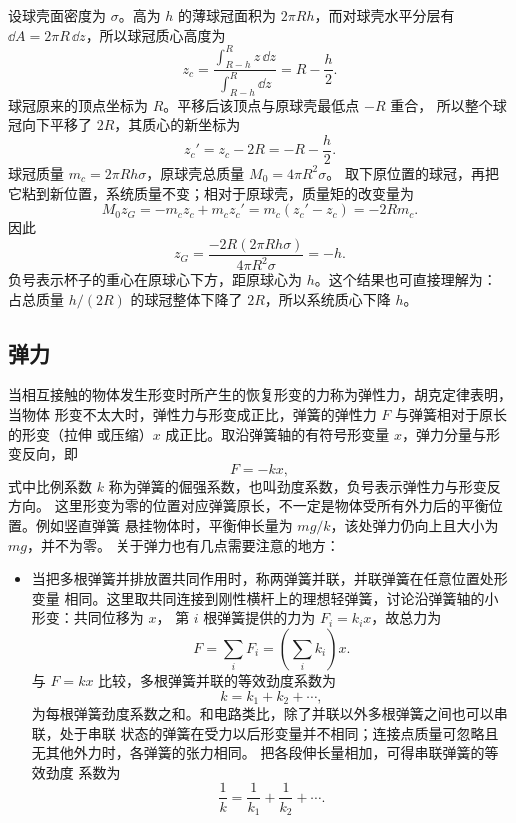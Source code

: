 {\begin{xesolution}
设球壳面密度为 $\sigma$。高为 $h$ 的薄球冠面积为 $2\pi Rh$，而对球壳水平分层有
$\dd A=2\pi R\,\dd z$，所以球冠质心高度为
\[
  z_c=\frac{\int_{R-h}^{R}z\,\dd z}{\int_{R-h}^{R}\dd z}
  =R-\frac h2.
\]
球冠原来的顶点坐标为 $R$。平移后该顶点与原球壳最低点 $-R$ 重合，
所以整个球冠向下平移了 $2R$，其质心的新坐标为
\[
  z_c'=z_c-2R=-R-\frac h2.
\]
球冠质量 $m_c=2\pi Rh\sigma$，原球壳总质量 $M_0=4\pi R^2\sigma$。
取下原位置的球冠，再把它粘到新位置，系统质量不变；相对于原球壳，质量矩的改变量为
\[
  M_0z_G=-m_cz_c+m_cz_c'
  =m_c(z_c'-z_c)=-2Rm_c.
\]
因此
\[
  z_G=\frac{-2R(2\pi Rh\sigma)}{4\pi R^2\sigma}
  =\boxed{-h}.
\]
负号表示杯子的重心在原球心下方，距原球心为 $h$。这个结果也可直接理解为：
占总质量 $h/(2R)$ 的球冠整体下降了 $2R$，所以系统质心下降 $h$。
\end{xesolution}

\subsection{弹力}

当相互接触的物体发生形变时所产生的恢复形变的力称为弹性力，胡克定律表明，当物体
形变不太大时，弹性力与形变成正比，弹簧的弹性力 $F$ 与弹簧相对于原长的形变（拉伸
或压缩）$x$ 成正比。取沿弹簧轴的有符号形变量 $x$，弹力分量与形变反向，即
\begin{equation}
  F=-kx,
\end{equation}
式中比例系数 $k$ 称为弹簧的倔强系数，也叫劲度系数，负号表示弹性力与形变反方向。
这里形变为零的位置对应弹簧原长，不一定是物体受所有外力后的平衡位置。例如竖直弹簧
悬挂物体时，平衡伸长量为 $mg/k$，该处弹力仍向上且大小为 $mg$，并不为零。
关于弹力也有几点需要注意的地方：

\begin{itemize}
  \item 当把多根弹簧并排放置共同作用时，称两弹簧并联，并联弹簧在任意位置处形变量
  相同。这里取共同连接到刚性横杆上的理想轻弹簧，讨论沿弹簧轴的小形变：共同位移为 $x$，
  第 $i$ 根弹簧提供的力为 $F_i=k_i x$，故总力为
  \[
    F=\sum_iF_i=\left(\sum_i k_i\right)x.
  \]
  与 $F=kx$ 比较，多根弹簧并联的等效劲度系数为
  \begin{equation}
    k=k_1+k_2+\cdots,
  \end{equation}
  为每根弹簧劲度系数之和。和电路类比，除了并联以外多根弹簧之间也可以串联，处于串联
  状态的弹簧在受力以后形变量并不相同；连接点质量可忽略且无其他外力时，各弹簧的张力相同。
  把各段伸长量相加，可得串联弹簧的等效劲度
  系数为
  \begin{equation}
    \frac1k=\frac1{k_1}+\frac1{k_2}+\cdots.
  \end{equation}


\end{itemize}}
